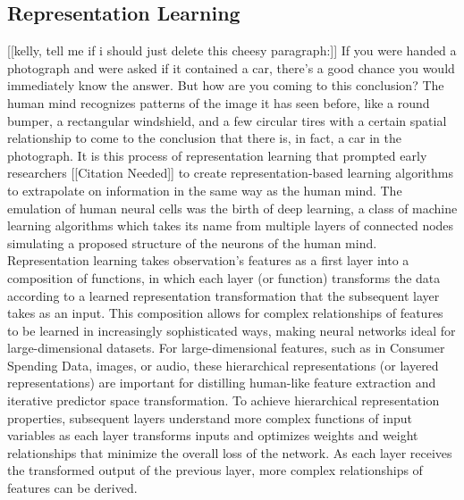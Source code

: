 \documentclass[12pt,twoside]{reedthesis}
\begin{document}
\subsection{Representation Learning}\label{representation-learning}

{[}{[}kelly, tell me if i should just delete this cheesy
paragraph:{]}{]} If you were handed a photograph and were asked if it
contained a car, there's a good chance you would immediately know the
answer. But how are you coming to this conclusion? The human mind
recognizes patterns of the image it has seen before, like a round
bumper, a rectangular windshield, and a few circular tires with a
certain spatial relationship to come to the conclusion that there is, in
fact, a car in the photograph. It is this process of representation
learning that prompted early researchers {[}{[}Citation Needed{]}{]} to
create representation-based learning algorithms to extrapolate on
information in the same way as the human mind. The emulation of human
neural cells was the birth of deep learning, a class of machine learning
algorithms which takes its name from multiple layers of connected nodes
simulating a proposed structure of the neurons of the human mind.
Representation learning takes observation's features as a first layer
into a composition of functions, in which each layer (or function)
transforms the data according to a learned representation transformation
that the subsequent layer takes as an input. This composition allows for
complex relationships of features to be learned in increasingly
sophisticated ways, making neural networks ideal for large-dimensional
datasets. For large-dimensional features, such as in Consumer Spending
Data, images, or audio, these hierarchical representations (or layered
representations) are important for distilling human-like feature
extraction and iterative predictor space transformation. To achieve
hierarchical representation properties, subsequent layers understand
more complex functions of input variables as each layer transforms
inputs and optimizes weights and weight relationships that minimize the
overall loss of the network. As each layer receives the transformed
output of the previous layer, more complex relationships of features can
be derived.
\end{document}

